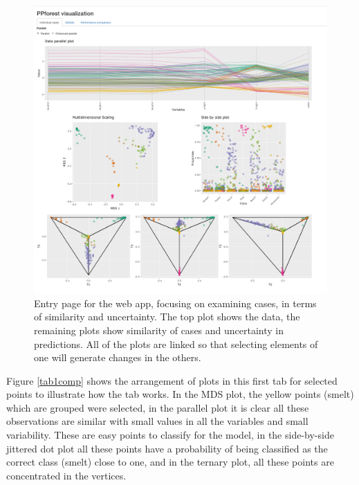 \documentclass[smallextended,natbib]{svjour3}\usepackage[]{graphicx}\usepackage[]{xcolor}
\begin{document}
\begin{figure}[hbpt]
\centering
\includegraphics[width=1.05\linewidth]{fish11.png}
\caption{Entry page for the web app, focusing on examining cases, in terms of similarity and uncertainty. The top plot shows the data, the remaining plots show similarity of cases and uncertainty in predictions. All of the plots are linked so that selecting elements of one will generate changes in the others. \label{tab1}}
\end{figure}

Figure \ref{tab1comp} shows the arrangement of plots in this first tab for selected points to illustrate how the tab works. In the MDS plot, the yellow points (smelt) which are grouped were selected, in the parallel plot it is clear all these observations are similar with small values in all the variables and small variability. These are easy points to classify for the model, in the side-by-side jittered dot plot all these points have a   probability of being classified as the correct class (smelt) close to one, and in the ternary plot, all these points are concentrated in the vertices.
\end{document}
